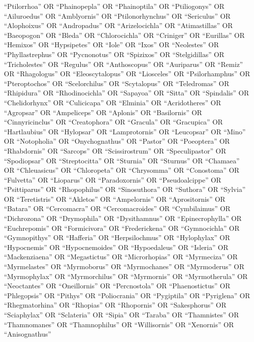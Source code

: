 \documentclass[
  number,
  review,
  onecolumn]{elsarticle}
\begin{document}
``Ptilorrhoa'' OR ``Phainopepla'' OR ``Phainoptila'' OR ``Ptiliogonys''
OR ``Ailuroedus'' OR ``Amblyornis'' OR ``Ptilonorhynchus'' OR
``Sericulus'' OR ``Alophoixus'' OR ``Andropadus'' OR ``Arizelocichla''
OR ``Atimastillas'' OR ``Baeopogon'' OR ``Bleda'' OR ``Chlorocichla'' OR
``Criniger'' OR ``Eurillas'' OR ``Hemixos'' OR ``Hypsipetes'' OR
``Iole'' OR ``Ixos'' OR ``Neolestes'' OR ``Phyllastrephus'' OR
``Pycnonotus'' OR ``Spizixos'' OR ``Stelgidillas'' OR ``Tricholestes''
OR ``Regulus'' OR ``Anthoscopus'' OR ``Auriparus'' OR ``Remiz'' OR
``Rhagologus'' OR ``Eleoscytalopus'' OR ``Liosceles'' OR
``Psilorhamphus'' OR ``Pteroptochos'' OR ``Scelorchilus'' OR
``Scytalopus'' OR ``Teledromas'' OR ``Rhipidura'' OR ``Rhodinocichla''
OR ``Sapayoa'' OR ``Sitta'' OR ``Spindalis'' OR ``Chelidorhynx'' OR
``Culicicapa'' OR ``Elminia'' OR ``Acridotheres'' OR ``Agropsar'' OR
``Ampeliceps'' OR ``Aplonis'' OR ``Basilornis'' OR ``Cinnyricinclus'' OR
``Creatophora'' OR ``Gracula'' OR ``Gracupica'' OR ``Hartlaubius'' OR
``Hylopsar'' OR ``Lamprotornis'' OR ``Leucopsar'' OR ``Mino'' OR
``Notopholia'' OR ``Onychognathus'' OR ``Pastor'' OR ``Poeoptera'' OR
``Rhabdornis'' OR ``Sarcops'' OR ``Scissirostrum'' OR ``Speculipastor''
OR ``Spodiopsar'' OR ``Streptocitta'' OR ``Sturnia'' OR ``Sturnus'' OR
``Chamaea'' OR ``Chleuasicus'' OR ``Chloropeta'' OR ``Chrysomma'' OR
``Conostoma'' OR ``Fulvetta'' OR ``Lioparus'' OR ``Paradoxornis'' OR
``Pseudoalcippe'' OR ``Psittiparus'' OR ``Rhopophilus'' OR
``Sinosuthora'' OR ``Suthora'' OR ``Sylvia'' OR ``Teretistris'' OR
``Akletos'' OR ``Ampelornis'' OR ``Aprositornis'' OR ``Batara'' OR
``Cercomacra'' OR ``Cercomacroides'' OR ``Cymbilaimus'' OR
``Dichrozona'' OR ``Drymophila'' OR ``Dysithamnus'' OR
``Epinecrophylla'' OR ``Euchrepomis'' OR ``Formicivora'' OR
``Frederickena'' OR ``Gymnocichla'' OR ``Gymnopithys'' OR ``Hafferia''
OR ``Herpsilochmus'' OR ``Hylophylax'' OR ``Hypocnemis'' OR
``Hypocnemoides'' OR ``Hypoedaleus'' OR ``Isleria'' OR ``Mackenziaena''
OR ``Megastictus'' OR ``Microrhopias'' OR ``Myrmeciza'' OR
``Myrmelastes'' OR ``Myrmoborus'' OR ``Myrmochanes'' OR ``Myrmoderus''
OR ``Myrmophylax'' OR ``Myrmorchilus'' OR ``Myrmornis'' OR
``Myrmotherula'' OR ``Neoctantes'' OR ``Oneillornis'' OR ``Percnostola''
OR ``Phaenostictus'' OR ``Phlegopsis'' OR ``Pithys'' OR ``Poliocrania''
OR ``Pygiptila'' OR ``Pyriglena'' OR ``Rhegmatorhina'' OR ``Rhopias'' OR
``Rhopornis'' OR ``Sakesphorus'' OR ``Sciaphylax'' OR ``Sclateria'' OR
``Sipia'' OR ``Taraba'' OR ``Thamnistes'' OR ``Thamnomanes'' OR
``Thamnophilus'' OR ``Willisornis'' OR ``Xenornis'' OR ``Anisognathus''
\end{document}
